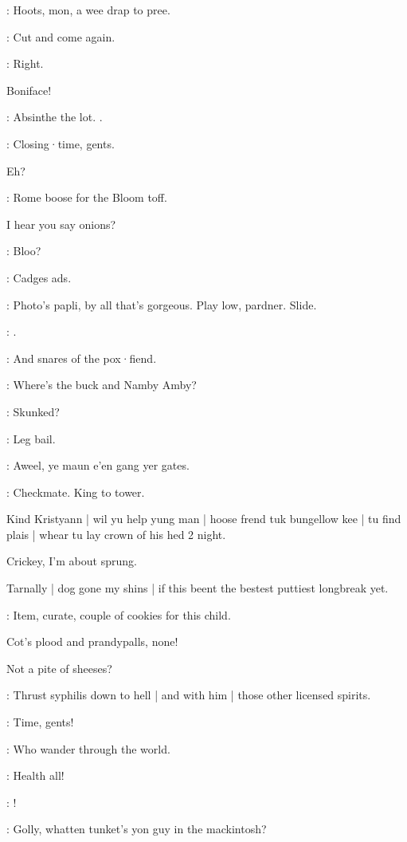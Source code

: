 \crotthers:
Hoots,
mon,
a wee drap to pree.

\lenehan:
Cut and come again.

\barman:
Right.

Boniface!

\stephen:
Absinthe the lot.
.

\barman:
Closing·time,
gents.

Eh?

\stephen:
Rome boose for the Bloom toff.

I hear you say onions?

\bannon:
Bloo?

\dixon:
Cadges ads.

\bannon:
Photo's papli,
by all that's gorgeous.
Play low,
pardner.
Slide.

\mulligan:
.


\stephen:
And snares of the pox·fiend.

\bantam:
Where's the buck and Namby Amby?

\stephen:
Skunked?

\lenehan:
Leg bail.

\crotthers:
Aweel,
ye maun e'en gang yer gates.

\stephen:
Checkmate.
King to tower.

Kind Kristyann |
wil yu help yung man |
hoose frend tuk bungellow kee |
tu find plais |
whear tu lay crown of his hed 2 night.

Crickey,
I'm about sprung.

Tarnally |
dog gone my shins |
if this beent the bestest puttiest longbreak yet.

\punch:
Item,
curate,
couple of cookies for this child.

Cot's plood and prandypalls,
none!

Not a pite of sheeses?

\stephen:
Thrust syphilis down to hell |
and with him |
those other licensed spirits.

\barman:
Time,
gents!

\stephen:
Who wander through the world.

\punch:
Health all!

\dixon:
!


\crotthers:
Golly,
whatten tunket's yon guy in the mackintosh?

